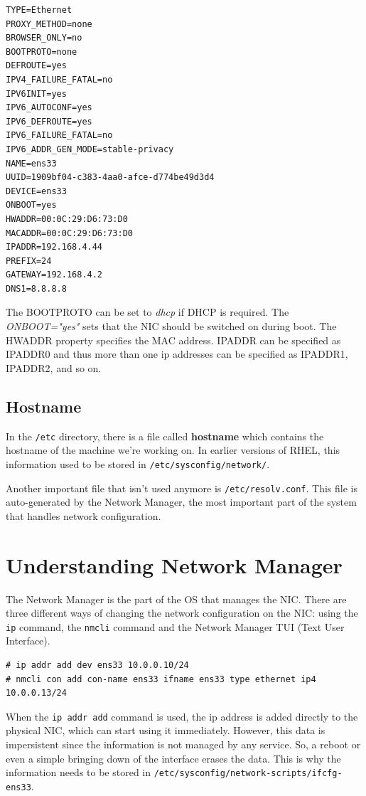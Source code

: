 \vspace{-15pt}
\begin{verbatim}
TYPE=Ethernet
PROXY_METHOD=none
BROWSER_ONLY=no
BOOTPROTO=none
DEFROUTE=yes
IPV4_FAILURE_FATAL=no
IPV6INIT=yes
IPV6_AUTOCONF=yes
IPV6_DEFROUTE=yes
IPV6_FAILURE_FATAL=no
IPV6_ADDR_GEN_MODE=stable-privacy
NAME=ens33
UUID=1909bf04-c383-4aa0-afce-d774be49d3d4
DEVICE=ens33
ONBOOT=yes
HWADDR=00:0C:29:D6:73:D0
MACADDR=00:0C:29:D6:73:D0
IPADDR=192.168.4.44
PREFIX=24
GATEWAY=192.168.4.2
DNS1=8.8.8.8
\end{verbatim}
\vspace{-10pt}

\noindent
The BOOTPROTO can be set to \textit{dhcp} if DHCP is required. The \textit{ONBOOT="yes"} sets that the NIC should be switched on during boot. The HWADDR property specifies the MAC address. IPADDR can be specified as IPADDR0 and thus more than one ip addresses can be specified as IPADDR1, IPADDR2, and so on. 

\subsection{Hostname} 
In the \verb|/etc| directory, there is a file called \textbf{hostname} which contains the hostname of the machine we're working on. In earlier versions of RHEL, this information used to be stored in \verb|/etc/sysconfig/network/|. 

Another important file that isn't used anymore is \verb|/etc/resolv.conf|. This file is auto-generated by the Network Manager, the most important part of the system that handles network configuration. 

	\section{Understanding Network Manager}
The Network Manager is the part of the OS that manages the NIC. There are three different ways of changing the network configuration on the NIC: using the \verb|ip| command, the \verb|nmcli| command and the Network Manager TUI (Text User Interface). 

\vspace{-15pt}
\begin{verbatim}
# ip addr add dev ens33 10.0.0.10/24 
# nmcli con add con-name ens33 ifname ens33 type ethernet ip4 10.0.0.13/24
\end{verbatim}
\vspace{-10pt}

When the \verb|ip addr add| command is used, the ip address is added directly to the physical NIC, which can start using it immediately. However, this data is impersistent since the information is not managed by any service. So, a reboot or even a simple bringing down of the interface erases the data. This is why the information needs to be stored in \verb|/etc/sysconfig/network-scripts/ifcfg-ens33|. 

